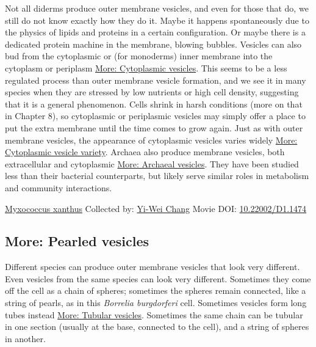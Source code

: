 \documentclass[]{tufte-book}
\begin{document}
Not all diderms produce outer membrane vesicles, and even for those that do, we still do not know exactly how they do it. Maybe it happens spontaneously due to the physics of lipids and proteins in a certain configuration. Or maybe there is a dedicated protein machine in the membrane, blowing bubbles. Vesicles can also bud from the cytoplasmic or (for monoderms) inner membrane into the cytoplasm or periplasm \protect\hyperlink{Cytoplasmic_vesicles}{More: Cytoplasmic vesicles}. This seems to be a less regulated process than outer membrane vesicle formation, and we see it in many species when they are stressed by low nutrients or high cell density, suggesting that it is a general phenomenon. Cells shrink in harsh conditions (more on that in Chapter 8), so cytoplasmic or periplasmic vesicles may simply offer a place to put the extra membrane until the time comes to grow again. Just as with outer membrane vesicles, the appearance of cytoplasmic vesicles varies widely \protect\hyperlink{Cytoplasmic_vesicle_variety}{More: Cytoplasmic vesicle variety}. Archaea also produce membrane vesicles, both extracellular and cytoplasmic \protect\hyperlink{Archaeal_vesicles}{More: Archaeal vesicles}. They have been studied less than their bacterial counterparts, but likely serve similar roles in metabolism and community interactions.



\hypertarget{htmlwidget-d554c485f0d706e1b2e6}{}

\label{fig:2-4}\protect\hyperlink{tree}{Myxococcus xanthus} Collected by: \protect\hyperlink{yi-wei_chang}{Yi-Wei Chang} Movie DOI: \href{https://doi.org/10.22002/D1.1474}{10.22002/D1.1474}

\hypertarget{Pearled_vesicles}{%
\subsection*{More: Pearled vesicles}\label{Pearled_vesicles}}

Different species can produce outer membrane vesicles that look very different. Even vesicles from the same species can look very different. Sometimes they come off the cell as a chain of spheres; sometimes the spheres remain connected, like a string of pearls, as in this \emph{Borrelia burgdorferi} cell. Sometimes vesicles form long tubes instead \protect\hyperlink{Tubular_vesicles}{More: Tubular vesicles}. Sometimes the same chain can be tubular in one section (usually at the base, connected to the cell), and a string of spheres in another.
\end{document}
